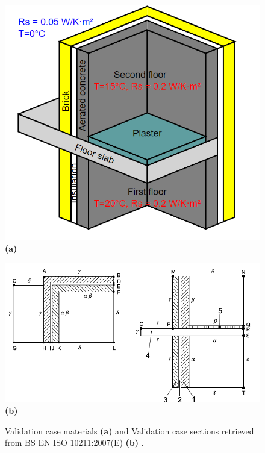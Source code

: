 \begin{figure}[tbh]
    \centering
    \begin{minipage}[t]{0.54\columnwidth}
        \centering
        \includegraphics[width=\linewidth]{Figures/validationcase}
        \textbf{(a)}
    \end{minipage}
    \hfill
    \begin{minipage}[t]{0.8\linewidth}
        \centering
        \includegraphics[width=\linewidth]{Figures/isodesc.png}
        \textbf{(b)}
    \end{minipage}
    
    \caption[3D Validation Materials]{Validation case materials \cite{ISO} \textbf{(a)} and Validation case sections retrieved from BS EN ISO 10211:2007(E) \textbf{(b)} \cite{ISO}.}
    \label{fig:validation-case-materials}
\end{figure}









